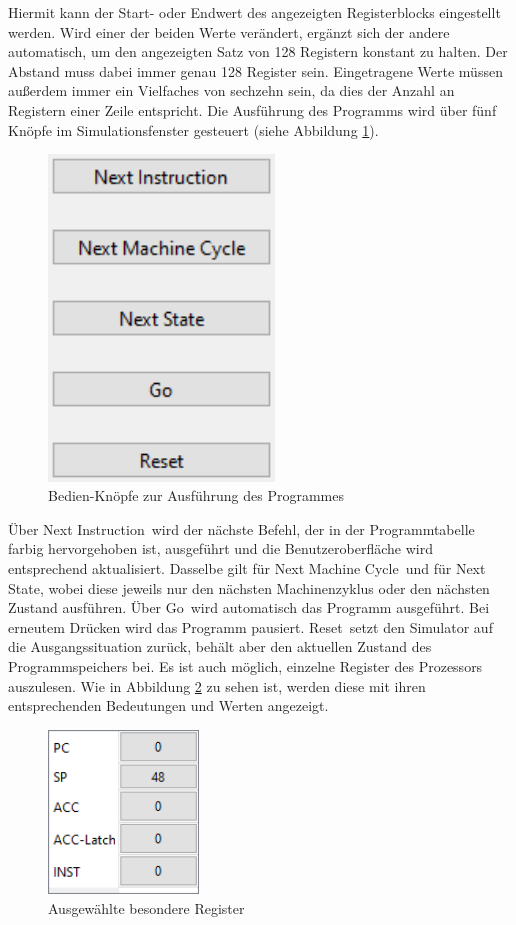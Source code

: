 \documentclass[12pt]{article}
\newcommand{\imgSpaceBefore}{\vspace{10pt}}
\begin{document}
\noindent
Hiermit kann der Start- oder Endwert des angezeigten Registerblocks eingestellt werden. Wird einer der beiden Werte verändert, ergänzt sich der andere automatisch, um den angezeigten Satz von 128 Registern konstant zu halten. Der Abstand muss dabei immer genau 128 Register sein. Eingetragene Werte müssen außerdem immer ein Vielfaches von sechzehn sein, da dies der Anzahl an Registern einer Zeile entspricht. Die Ausführung des Programms wird über fünf Knöpfe im Simulationsfenster gesteuert (siehe Abbildung \ref{fig:Bedienen}).\imgSpaceBefore

\begin{figure}[H]
\centering
\includegraphics[width=6cm]{bilder/Bedienen}
\caption{Bedien-Knöpfe zur Ausführung des Programmes}
\label{fig:Bedienen}
\end{figure}

\noindent
Über \glqq Next Instruction\grqq\ wird der nächste Befehl, der in der Programmtabelle farbig hervorgehoben ist, ausgeführt und die Benutzeroberfläche wird entsprechend aktualisiert. Dasselbe gilt für \glqq Next Machine Cycle\grqq\ und für \glqq Next State\grqq, wobei diese jeweils nur den nächsten Machinenzyklus oder den nächsten Zustand ausführen. Über \glqq Go\grqq\ wird automatisch das Programm ausgeführt. Bei erneutem Drücken wird das Programm pausiert. \glqq Reset\grqq\ setzt den Simulator auf die Ausgangssituation zurück, behält aber den aktuellen Zustand des Programmspeichers bei. Es ist auch möglich, einzelne Register des Prozessors auszulesen. Wie in Abbildung \ref{fig:Register} zu sehen ist, werden diese mit ihren entsprechenden Bedeutungen und Werten angezeigt.\imgSpaceBefore

\begin{figure}[h]
\centering
\includegraphics[width=4cm]{bilder/Register}
\caption{Ausgewählte besondere Register}
\label{fig:Register}
\end{figure}
\end{document}
